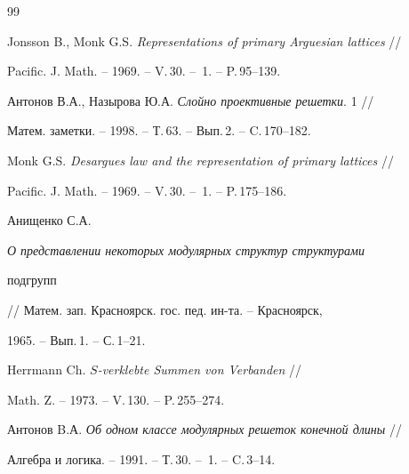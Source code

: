 \begin{thebibliography}{99}







Jonsson B., Monk G.S. {\em Representations of primary Arguesian lattices} //


Pacific. J. Math. -- 1969. -- V.\,30. -- \No\,1. -- P.\,95--139.




Антонов В.А., Назырова Ю.А. {\em Слойно проективные решетки}. 1 //


Матем. заметки. -- 1998. -- Т.\,63. -- Вып.\,2. -- C.\,170--182.




Monk G.S. {\em Desargues law and the representation of primary lattices} //


Pacific. J. Math. -- 1969. -- V.\,30. -- \No\,1. -- P.\,175--186.




Анищенко С.А. {\em О представлении некоторых модулярных структур структурами


подгрупп} // Матем. зап. Красноярск. гос. пед. ин-та. -- Красноярск,


1965. -- Вып.\,1. -- С.\,1--21.




Herrmann Ch. {\em $S$-verklebte Summen von Verbanden} //


Math. Z. -- 1973. -- V.\,130. -- P.\,255--274.




Антонов B.А. {\em Об одном классе модулярных решеток конечной длины} //


Алгебра и логика. -- 1991. -- Т.\,30. -- \No\,1. -- C.\,3--14.





\end{thebibliography}





\vskip 2cm












\label{end}





